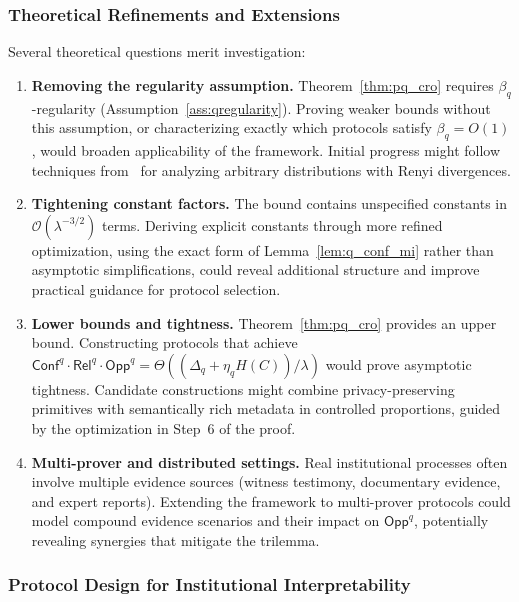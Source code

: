 \documentclass{ieeeaccess}
\newcommand{\Conf}{\mathsf{Conf}}
\newcommand{\Rel}{\mathsf{Rel}}
\newcommand{\Opp}{\mathsf{Opp}}
\begin{document}
\subsubsection{Theoretical Refinements and Extensions}

Several theoretical questions merit investigation:

\begin{enumerate}
    \item \textbf{Removing the regularity assumption.} Theorem~\ref{thm:pq_cro} 
    requires $\beta_q$-regularity (Assumption~\ref{ass:qregularity}). Proving weaker 
    bounds without this assumption, or characterizing exactly which protocols satisfy 
    $\beta_q = O(1)$, would broaden applicability of the framework. Initial progress 
    might follow techniques from~\cite{Bun2020} for analyzing arbitrary distributions 
    with Renyi divergences.
    
    \item \textbf{Tightening constant factors.}  The bound contains unspecified 
    constants in $\mathcal{O}(\lambda^{-3/2})$ terms. Deriving explicit constants 
    through more refined optimization, using the exact form of Lemma~\ref{lem:q_conf_mi} 
    rather than asymptotic simplifications, could reveal additional structure and 
    improve practical guidance for protocol selection.
    
    \item \textbf{Lower bounds and tightness.} Theorem~\ref{thm:pq_cro} provides an 
    upper bound. Constructing protocols that achieve $\Conf^q \cdot \Rel^q \cdot \Opp^q = 
    \Theta((\Delta_q + \eta_q H(C))/\lambda)$ would prove asymptotic tightness. 
    Candidate constructions might combine privacy-preserving primitives with 
    semantically rich metadata in controlled proportions, guided by the optimization 
    in Step~6 of the proof.
    
    \item \textbf{Multi-prover and distributed settings.} Real institutional processes 
    often involve multiple evidence sources (witness testimony, documentary evidence, 
    and expert reports). Extending the framework to multi-prover protocols could model 
    compound evidence scenarios and their impact on $\Opp^q$, potentially revealing 
    synergies that mitigate the trilemma.
\end{enumerate}

\subsubsection{Protocol Design for Institutional Interpretability}
\end{document}
